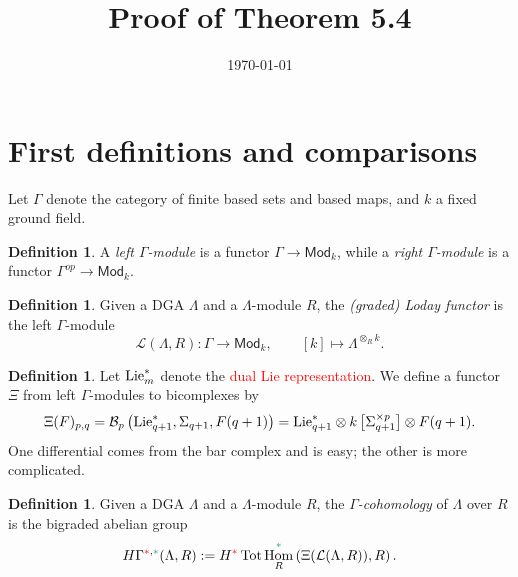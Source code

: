 \documentclass[11pt,reqno
,draft
]{amsart}
\title{Proof of Theorem 5.4}
\date{\today}
\numberwithin{equation}{section}
\numberwithin{figure}{section}
\theoremstyle{definition} %
\newtheorem{definition}[equation]{Definition}%
\DeclareMathOperator{\Hom}{Hom}%
\newcommand{\Ksi}{\Xi}
\newcommand{\Lie}{\mathrm{Lie}}
\newcommand{\Loday}{\mathcal L}
\newcommand{\redstar}{{\color{red}\**}}
\newcommand{\greenstar}{{\color{ForestGreen}\**}}
\newcommand{\Mod}{\mathsf{Mod}}
\DeclareMathOperator{\Tot}{Tot}
\begin{document}


 \maketitle


\section{First definitions and comparisons}


Let $\Gamma$ denote the category of finite based sets and based maps, and $k$ a fixed ground field.
\begin{definition}
        A \textit{left $\Gamma$-module} is a functor $\Gamma \to \Mod_k$, while a
        \textit{right $\Gamma$-module} is a functor $\Gamma^{op} \to \Mod_k$.
\end{definition}

\begin{definition}
        Given a DGA $\Lambda$ and a $\Lambda$-module $R$, the \textit{(graded) Loday functor} is the left $\Gamma$-module
        \[
                \Loday(\Lambda, R) \colon \Gamma \to \Mod_k,
                \qquad
                [k] \mapsto \Lambda^{\otimes_R k}.
        \]
\end{definition}

\begin{definition}
        Let $\Lie_m^{\**}$ denote the \textcolor{red}{dual Lie representation}.
        We define a functor $\Ksi$ from left $\Gamma$-modules to bicomplexes by
        \[
                \Ksi(F)_{p,q} = \mathcal B_p \left( \Lie_{q+1}^{\**}, \Sigma_{q+1}, F(q+1) \right)
                = \Lie_{q+1}^{\**} \otimes k\left[\Sigma_{q+1}^{\times p}\right] \otimes F(q+1).
        \]
        One differential comes from the bar complex and is easy; the other is more complicated.
\end{definition}

\begin{definition}
        Given a DGA $\Lambda$ and a $\Lambda$-module $R$, the \textit{$\Gamma$-cohomology} of $\Lambda$ over $R$ is the bigraded abelian group
        \[
                H\Gamma^{\redstar, \greenstar}(\Lambda, R) := H^{\redstar} \Tot \Hom_R^{\greenstar} \left( \Ksi(\Loday(\Lambda, R)), R \right).
        \]
\end{definition}
\end{document}
